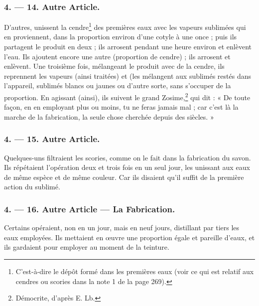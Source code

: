 \documentclass[a4paper, 11pt, oneside, polutonikogreek, french]{article}
\begin{document}
\bigskip
\centerline{\EightStarTaper}
\centerline{\EightStarTaper\EightStarTaper}
\bigskip

\subsubsection{4. --- 14. Autre Article.}

D'autres, unissent la cendre\footnote{C'est-à-dire le dépôt formé dans les premières eaux (voir ce qui est relatif aux cendres ou scories dans la note 1 de la page 269).} des premières eaux avec les vapeurs sublimées qui en proviennent, dans la proportion environ d'une cotyle à une once ; puis ils partagent le produit en deux ; ils arrosent pendant une heure environ et enlèvent l'eau. Ils ajoutent encore une autre (proportion de cendre) ; ils arrosent et enlèvent. Une troisième fois, mélangeant le produit avec de la cendre, ils reprennent les vapeurs (ainsi traitées) et (les mélangent aux sublimés restés dans l'appareil, sublimés blancs ou jaunes ou d'autre sorte, sans s'occuper de la proportion. En agissant (ainsi), ils suivent le grand Zosime,\footnote{Démocrite, d'après E. Lb.} qui dit : « De toute façon, en en employant plus ou moins, tu ne feras jamais mal ; car c'est là la marche de la fabrication, la seule chose cherchée depuis des siècles. »

\bigskip
\centerline{\EightStarTaper}
\centerline{\EightStarTaper\EightStarTaper}
\bigskip

\subsubsection{4. --- 15. Autre Article.}

Quelques-uns filtraient les scories, comme on le fait dans la fabrication du savon. Ils répétaient l'opération deux et trois fois en un seul jour, les unissant aux eaux de même espèce et de même couleur. Car ils disaient qu'il suffit de la première action du sublimé.

\bigskip
\centerline{\EightStarTaper}
\centerline{\EightStarTaper\EightStarTaper}
\bigskip

\subsubsection{4. --- 16. Autre Article --- La Fabrication.}

Certains opéraient, non en un jour, mais en neuf jours, distillant par tiers les eaux employées. Ils mettaient en œuvre une proportion égale et pareille d'eaux, et ils gardaient pour employer au moment de la teinture.
\end{document}
